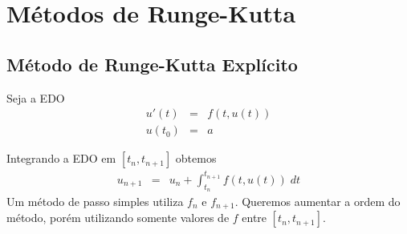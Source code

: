 %
%
%
%
%
%
%




\section{Métodos de Runge-Kutta}
\subsection{Método de Runge-Kutta Explícito}
Seja a EDO
\begin{eqnarray}
  u'(t) &=&f(t,u(t)) \\
  u(t_0) &=&a
\end{eqnarray}

Integrando a EDO em $[t_n,t_{n+1}]$ obtemos
\begin{eqnarray}
  u_{n+1}  &=&u_n  + \int _{t_n}^{t_{n+1}} f(t,u(t)) \; dt
\end{eqnarray}
Um método de passo simples utiliza $f_n$ e $f_{n+1}$. Queremos aumentar a ordem do método, porém utilizando somente valores de $f$ entre $[t_n,t_{n+1}]$.

